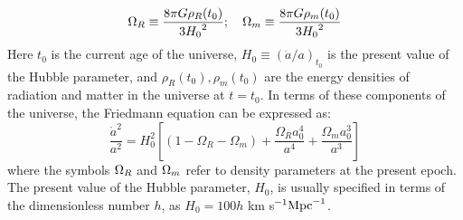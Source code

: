 \begin{equation}
 {\Omega_R} \equiv \frac{8\pi G \rho_R(t_0)}{3 {H_0}^2}; \quad {\Omega_m} \equiv \frac{8\pi G \rho_m(t_0)}{3 {H_0}^2}
\end{equation} 
Here $t_0$ is the current age of the universe, $H_0\equiv(\dot a/a)_{t_0}$ is the present value of the Hubble parameter, and $\rho_R(t_0), \rho_m(t_0)$ are the energy densities of radiation and matter in the universe at $t= t_0$. 
In terms of these components of the universe, the Friedmann equation can be expressed as:
\begin{equation}
 \frac{\dot a^2}{a^2} = H_0^2 \left[ ( 1 - \Omega_R - \Omega_m)+ \frac{\Omega_R a_0^4}{a^4} + \frac{\Omega_m a_0^3}{a^3}\right]
\label{a1}
\end{equation} 
where the symbols ${\Omega_R}$ and ${\Omega_m}$ refer to density parameters at the present epoch. The present value of the Hubble parameter, $H_0$, is usually specified in terms of the dimensionless number $h$, as $H_0 = 100 h$ km s$^{-1} {\rm Mpc}^{-1}$. 

